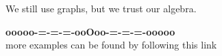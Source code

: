 \documentclass{ximera}
\begin{document}
We still use graphs, but we trust our algebra.



























\begin{center}
\textbf{\textcolor{green!50!black}{ooooo-=-=-=-ooOoo-=-=-=-ooooo}} \\

more examples can be found by following this link\\ 

\end{center}
\end{document}
